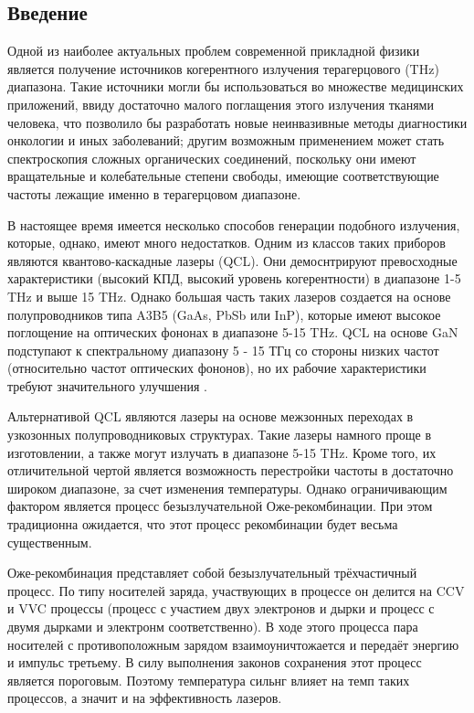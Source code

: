 \documentclass[../main.tex]{subfiles}
\begin{document}
\begin{center}
    \chapter{Введение}
\end{center}

Одной из наиболее актуальных проблем современной прикладной физики является
получение источников когерентного излучения терагерцового (THz) диапазона. Такие
источники могли бы использоваться во множестве медицинских приложений, ввиду достаточно 
малого поглащения этого излучения тканями человека, что позволило бы разработать 
новые неинвазивные методы диагностики онкологии и иных заболеваний; другим возможным 
применением может стать спектроскопия сложных органических соединений, поскольку 
они имеют вращательные и колебательные степени свободы, имеющие соответствующие частоты 
лежащие именно в терагерцовом диапазоне.

В настоящее время имеется несколько способов генерации подобного излучения, которые, однако, 
имеют много недостатков. Одним из классов таких приборов являются квантово-каскадные лазеры (QCL).
Они демоснтрируют превосходные характеристики (высокий КПД, высокий уровень когерентности)
в диапазоне 1-5 THz и выше 15 THz. Однако большая часть таких лазеров создается на основе 
полупроводников типа A3B5 (GaAs, PbSb или InP), которые имеют высокое поглощение на оптических 
фононах в диапазоне 5-15 THz. QCL на основе GaN подступают к спектральному диапазону 5 - 15 ТГц со
стороны низких частот (относительно частот оптических фононов), но их рабочие характеристики 
требуют значительного улучшения \cite{Intro7}.

Альтернативой QCL являются лазеры на основе межзонных переходах в узкозонных полупроводниковых структурах.
Такие лазеры намного проще в изготовлении, а также могут излучать в диапазоне 5-15 THz. Кроме того, их 
отличительной чертой является возможность перестройки частоты в достаточно широком диапазоне, за счет 
изменения температуры. Однако ограничивающим
фактором является процесс безызлучательной Оже-рекомбинации. При этом традиционна ожидается, что этот процесс
рекомбинации будет весьма существенным.

Оже-рекомбинация представляет собой безызлучательный трёхчастичный процесс. По типу носителей заряда, участвующих
в процессе он делится на CCV и VVC процессы (процесс с участием двух электронов и дырки и процесс с двумя дырками
и электронм соответственно). В ходе этого процесса пара носителей с противоположным зарядом взаимоуничтожается и
передаёт энергию и импульс третьему. В силу выполнения законов сохранения этот процесс является пороговым.
Поэтому температура сильнг влияет на темп таких процессов, а значит и на эффективность лазеров.
\end{document}
